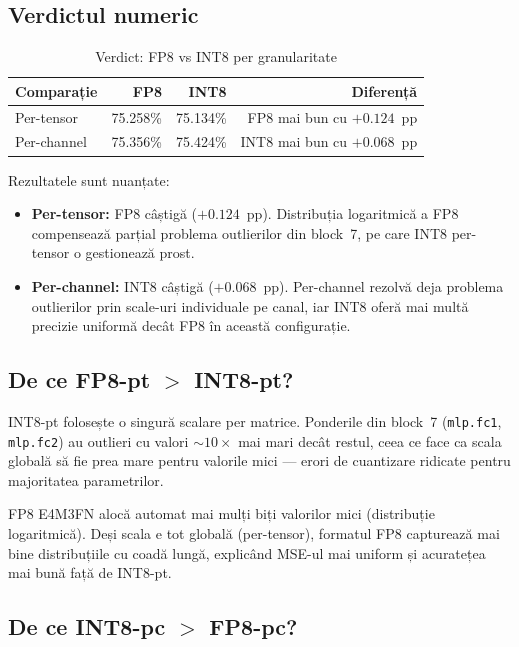 \documentclass[12pt,a4paper]{article}
\begin{document}
\subsection{Verdictul numeric}

\begin{table}[H]
  \centering
  \caption{Verdict: FP8 vs INT8 per granularitate}
  \begin{tabular}{lrrr}
    \toprule
    \textbf{Comparație} & \textbf{FP8} & \textbf{INT8} &
    \textbf{Diferență} \\
    \midrule
    Per-tensor & 75.258\% & 75.134\% & FP8 mai bun cu $+0.124$~pp \\
    Per-channel & 75.356\% & 75.424\% & INT8 mai bun cu $+0.068$~pp \\
    \bottomrule
  \end{tabular}
  \label{tab:verdict}
\end{table}

Rezultatele sunt nuanțate:
\begin{itemize}
  \item \textbf{Per-tensor:} FP8 câștigă ($+0.124$~pp). Distribuția
    logaritmică a FP8 compensează parțial problema outlierilor din block~7,
    pe care INT8 per-tensor o gestionează prost.
  \item \textbf{Per-channel:} INT8 câștigă ($+0.068$~pp). Per-channel
    rezolvă deja problema outlierilor prin scale-uri individuale pe canal,
    iar INT8 oferă mai multă precizie uniformă decât FP8 în această
    configurație.
\end{itemize}

\subsection{De ce FP8-pt $>$ INT8-pt?}

INT8-pt folosește o singură scalare per matrice. Ponderile din block~7
(\texttt{mlp.fc1}, \texttt{mlp.fc2}) au outlieri cu valori
$\sim 10\times$ mai mari decât restul, ceea ce face ca scala globală să
fie prea mare pentru valorile mici --- erori de cuantizare ridicate
pentru majoritatea parametrilor.

FP8 E4M3FN alocă automat mai mulți biți valorilor mici (distribuție
logaritmică). Deși scala e tot globală (per-tensor), formatul FP8
capturează mai bine distribuțiile cu coadă lungă, explicând MSE-ul
mai uniform și acuratețea mai bună față de INT8-pt.

\subsection{De ce INT8-pc $>$ FP8-pc?}
\end{document}
